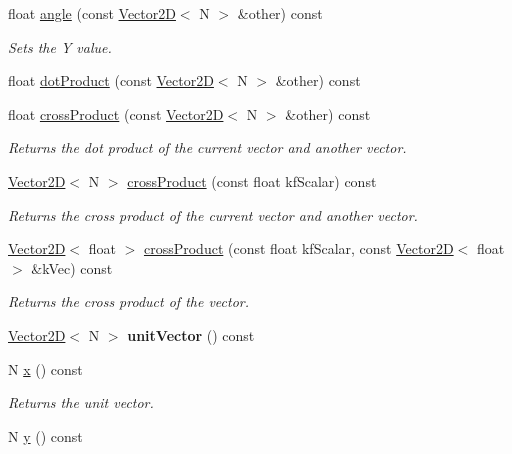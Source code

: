 \begin{DoxyCompactItemize}
float \hyperlink{class_vector2_d_a470b4b79c5bad154922113a7fd4272ee}{angle} (const \hyperlink{class_vector2_d}{Vector2\+D}$<$ N $>$ \&other) const 
\begin{DoxyCompactList}\small\item\em Sets the Y value. \end{DoxyCompactList}\item 
float \hyperlink{class_vector2_d_a0454fdd76683b17dc456c9d1b5ac9166}{dot\+Product} (const \hyperlink{class_vector2_d}{Vector2\+D}$<$ N $>$ \&other) const 
\item 
float \hyperlink{class_vector2_d_a9f41b23b1b0cf0b6d68772f8642ad7f1}{cross\+Product} (const \hyperlink{class_vector2_d}{Vector2\+D}$<$ N $>$ \&other) const 
\begin{DoxyCompactList}\small\item\em Returns the dot product of the current vector and another vector. \end{DoxyCompactList}\item 
\hyperlink{class_vector2_d}{Vector2\+D}$<$ N $>$ \hyperlink{class_vector2_d_ae270e23529e253fe49e1a8d98b059d73}{cross\+Product} (const float kf\+Scalar) const 
\begin{DoxyCompactList}\small\item\em Returns the cross product of the current vector and another vector. \end{DoxyCompactList}\item 
\hyperlink{class_vector2_d}{Vector2\+D}$<$ float $>$ \hyperlink{class_vector2_d_a17f850d113f71036587f573fc7acd7f7}{cross\+Product} (const float kf\+Scalar, const \hyperlink{class_vector2_d}{Vector2\+D}$<$ float $>$ \&k\+Vec) const 
\begin{DoxyCompactList}\small\item\em Returns the cross product of the vector. \end{DoxyCompactList}\item 
\hypertarget{class_vector2_d_a00aac8564c3e98d800fa3687ca159f91}{\hyperlink{class_vector2_d}{Vector2\+D}$<$ N $>$ {\bfseries unit\+Vector} () const }\label{class_vector2_d_a00aac8564c3e98d800fa3687ca159f91}

\item 
\hypertarget{class_vector2_d_adc7c5d679051dc6c8b6a1c6ee3c5abbf}{N \hyperlink{class_vector2_d_adc7c5d679051dc6c8b6a1c6ee3c5abbf}{x} () const }\label{class_vector2_d_adc7c5d679051dc6c8b6a1c6ee3c5abbf}

\begin{DoxyCompactList}\small\item\em Returns the unit vector. \end{DoxyCompactList}\item 
\hypertarget{class_vector2_d_a3b3d6a9a07bba8871954400d92f233d7}{N \hyperlink{class_vector2_d_a3b3d6a9a07bba8871954400d92f233d7}{y} () const }\label{class_vector2_d_a3b3d6a9a07bba8871954400d92f233d7}


\end{DoxyCompactItemize}
